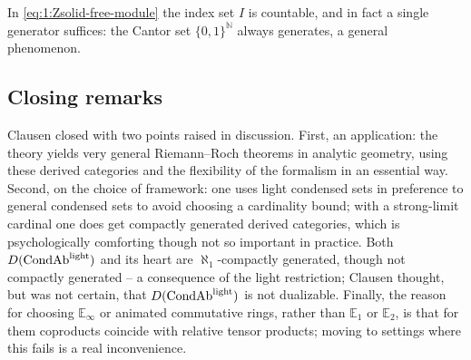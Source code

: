 \begin{remark}
\label{rmk:1:single-generator}
In \eqref{eq:1:Zsolid-free-module} the index set $I$ is countable, and in fact a
single generator suffices: the Cantor set $\{0,1\}^{\mathbb{N}}$ always generates,
a general phenomenon.
\end{remark}

\subsection{Closing remarks}

Clausen closed with two points raised in discussion. First, an application: the
theory yields very general Riemann--Roch theorems in analytic geometry, using
these derived categories and the flexibility of the formalism in an essential
way. Second, on the choice of framework: one uses light
condensed sets in preference to general condensed sets to avoid choosing a
cardinality bound; with a strong-limit cardinal one does get compactly generated
derived categories, which is psychologically comforting though not so important in
practice. Both $D(\mathrm{CondAb}^{\mathrm{light}})$ and its heart are $\aleph_1$-compactly generated, though not
compactly generated -- a consequence of the light restriction; Clausen thought,
but was not certain, that $D(\mathrm{CondAb}^{\mathrm{light}})$ is not dualizable. Finally, the reason for choosing $\mathbb{E}_\infty$ or animated
commutative rings, rather than $\mathbb{E}_1$ or $\mathbb{E}_2$, is that for them
coproducts coincide with relative tensor products; moving to settings where this
fails is a real inconvenience.
